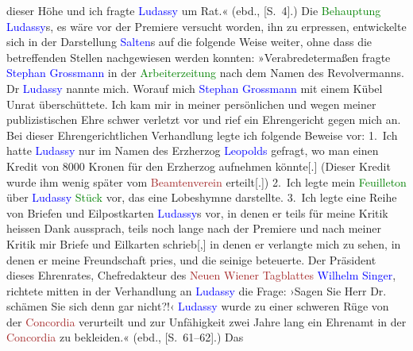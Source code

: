 {{{                     dieser Höhe und ich fragte \textcolor{blue}{Ludassy} um
                     Rat.« (ebd., [S. 4].) Die
                  \textcolor{green}{Behauptung}{ }\textcolor{blue}{Ludassy}s, es wäre vor der
                  Premiere versucht worden, ihn zu erpressen, 
                  entwickelte sich in der Darstellung
                     \textcolor{blue}{Salten}s auf die folgende Weise weiter, ohne dass die betreffenden
                  Stellen nachgewiesen werden konnten:
                     »Verabredetermaßen fragte \textcolor{blue}{Stephan
                        Grossmann} in der \textcolor{green}{Arbeiterzeitung}
                     nach dem Namen des Revolvermanns. Dr \textcolor{blue}{Ludassy} nannte mich. Worauf mich \textcolor{blue}{Stephan Grossmann} mit einem Kübel Unrat überschüttete. Ich kam mir in
                     meiner persönlichen und wegen meiner publizistischen Ehre schwer verletzt vor
                     und rief ein Ehrengericht gegen mich an. Bei dieser Ehrengerichtlichen
                     Verhandlung legte ich folgende Beweise vor: 1. Ich hatte \textcolor{blue}{Ludassy} nur im Namen des Erzherzog \textcolor{blue}{Leopolds} gefragt, wo man einen Kredit von 8000 Kronen
                     für den Erzherzog aufnehmen könnte{[}.{]} (Dieser Kredit wurde
                     ihm wenig später vom \textcolor{brown}{Beamtenverein}
                        erteilt{[}.{]}) 2. Ich legte mein \textcolor{green}{Feuilleton} über \textcolor{blue}{Ludassy}{ }\textcolor{green}{Stück} vor, das eine
                     Lobeshymne darstellte. 3. Ich legte eine Reihe von Briefen und Eilpostkarten
                        \textcolor{blue}{Ludassy}s vor, in denen er teils für
                     meine Kritik heissen Dank aussprach, teils noch lange nach der Premiere und
                     nach meiner Kritik mir Briefe und Eilkarten schrieb{[},{]} in
                     denen er verlangte mich zu sehen, in denen er meine Freundschaft pries, und die
                     seinige beteuerte. Der Präsident dieses Ehrenrates, Chefredakteur des \textcolor{brown}{Neuen Wiener Tagblattes}{ }\textcolor{blue}{Wilhelm Singer}, richtete mitten in der
                     Verhandlung an \textcolor{blue}{Ludassy} die Frage: ›Sagen
                     Sie Herr Dr. schämen Sie sich denn gar nicht?!‹ \textcolor{blue}{Ludassy} wurde zu einer schweren Rüge von der \textcolor{brown}{Concordia} verurteilt und zur Unfähigkeit
                     zwei Jahre lang ein Ehrenamt in der \textcolor{brown}{Concordia} zu bekleiden.« (ebd., [S. 61–62].) Das
}}}
